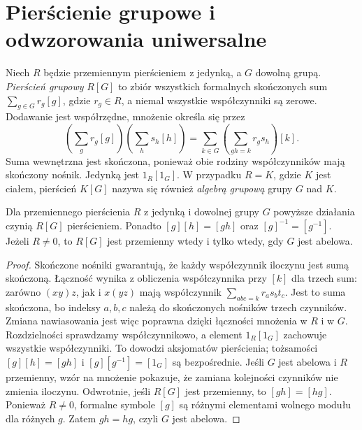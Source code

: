 \section{Pierścienie grupowe i odwzorowania uniwersalne}
\begin{definicja}
\label{aa:def:nc-group-ring}
Niech $R$ będzie przemiennym pierścieniem z jedynką,
a $G$ dowolną grupą. \emph{Pierścień grupowy} $R[G]$
to zbiór wszystkich formalnych skończonych sum
$\sum_{g\in G}r_g[g]$, gdzie $r_g\in R$, a niemal
wszystkie współczynniki są zerowe. Dodawanie jest
współrzędne, mnożenie określa się przez
\[
\left(\sum_g r_g[g]\right)\left(\sum_h s_h[h]\right)
 =\sum_{k\in G}\left(\sum_{gh=k}r_gs_h\right)[k].
\]
Suma wewnętrzna jest skończona, ponieważ obie rodziny
współczynników mają skończony nośnik. Jedynką jest
$1_R[1_G]$. W przypadku $R=K$, gdzie $K$ jest
ciałem, pierścień $K[G]$ nazywa się również
\emph{algebrą grupową} grupy $G$ nad $K$.
\end{definicja}
\begin{stwierdzenie}
\label{aa:st:nc-group-ring-ring}
Dla przemiennego pierścienia $R$ z jedynką i dowolnej
grupy $G$ powyższe działania czynią $R[G]$ pierścieniem.
Ponadto $[g][h]=[gh]$ oraz $[g]^{-1}=[g^{-1}]$.
Jeżeli $R\ne0$, to $R[G]$ jest przemienny wtedy
i tylko wtedy, gdy $G$ jest abelowa.
\end{stwierdzenie}
\begin{proof}
Skończone nośniki gwarantują, że każdy współczynnik
iloczynu jest sumą skończoną. Łączność wynika z
obliczenia współczynnika przy $[k]$ dla trzech sum:
zarówno $(xy)z$, jak i $x(yz)$ mają współczynnik
$\sum_{abc=k}r_as_bt_c$. Jest to suma skończona,
bo indeksy $a,b,c$ należą do skończonych nośników
trzech czynników. Zmiana nawiasowania jest
więc poprawna dzięki łączności mnożenia w $R$
i w $G$. Rozdzielności sprawdzamy współczynnikowo,
a element $1_R[1_G]$ zachowuje wszystkie współczynniki.
To dowodzi aksjomatów pierścienia; tożsamości
$[g][h]=[gh]$ i $[g][g^{-1}]=[1_G]$ są bezpośrednie.
Jeśli $G$ jest abelowa i $R$ przemienny, wzór na
mnożenie pokazuje, że zamiana kolejności czynników
nie zmienia iloczynu. Odwrotnie, jeśli $R[G]$
jest przemienny, to $[gh]=[hg]$. Ponieważ
$R\ne0$, formalne symbole $[g]$ są różnymi
elementami wolnego modułu dla różnych $g$.
Zatem $gh=hg$, czyli $G$ jest abelowa.
\end{proof}

